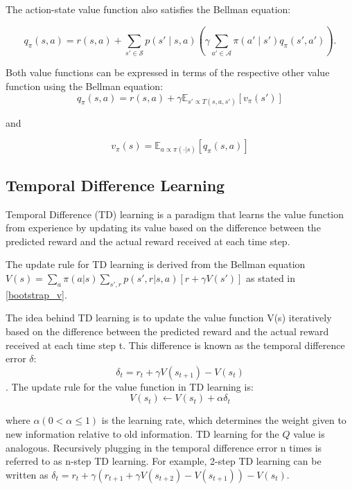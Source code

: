 The action-state value function also satisfies the Bellman equation:

\begin{equation}
    \label{bmeq_q}
    q_{\pi}(s,a) = r(s,a) + \sum_{s' \in \mathcal{S}} p(s' \mid s,a) \left(\gamma \sum_{a' \in \mathcal{A}} \pi(a' \mid s') q_{\pi}(s',a')\right).
\end{equation}

Both value functions can be expressed in terms of the respective other value function using the Bellman equation:
\begin{equation}
    \label{q_from_v}
    q_{\pi}(s,a) = r(s,a) + \gamma \mathbb{E}_{s'\propto T(s,a,s')}\left[ v_{\pi}(s') \right]
\end{equation}

and 

\begin{equation}
    v_{\pi}(s) = \mathbb{E}_{a \propto \pi(\cdot|s)} \left[ q_\pi(s,a) \right]
\end{equation}

\subsection{Temporal Difference Learning}
Temporal Difference (TD) learning is a paradigm that learns the value function from experience by updating its value based on the difference between the predicted reward and the actual reward received at each time step.

The update rule for TD learning is derived from the Bellman equation\\ 
${V(s) = \sum_{a}\pi(a|s)\sum_{s',r}p(s',r|s,a)\left[r + \gamma V(s')\right]}$ as stated in \ref{bootstrap_v}.

The idea behind TD learning is to update the value function V(s) iteratively based on the difference between the predicted reward and the actual reward received at each time step t. This difference is known as the temporal difference error $\delta$:
\begin{equation}
    \label{TD_update}
    \delta_t = r_t + \gamma V(s_{t+1}) - V(s_t)
\end{equation}
. The update rule for the value function in TD learning is:
$$V(s_t) \leftarrow V(s_t) + \alpha \delta_t$$

where $\alpha (0 < \alpha \leq 1)$ is the learning rate, which determines the weight given to new information relative to old information. TD learning for the $Q$ 
value is analogous. Recursively plugging in the temporal difference error n times is referred to as n-step TD learning. For example, 2-step TD learning can be written as 
$\delta_t = r_t + \gamma (r_{t+1} + \gamma V(s_{t+2}) - V(s_{t+1})  ) - V(s_t)$.\\

